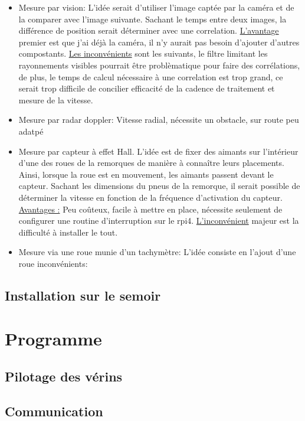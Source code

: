 \begin{itemize}
    \item Mesure par vision: L'idée serait d'utiliser l'image captée par la caméra et de la comparer avec l'image suivante. Sachant le temps entre deux images,
          la différence de position serait déterminer avec une correlation. \underline{L'avantage} premier est que j'ai déjà la caméra, il n'y aurait pas besoin d'ajouter d'autres compostants.
          \underline{Les inconvénients} sont les suivants, le filtre limitant les rayonnements visibles pourrait être problèmatique pour faire des corrélations, de plus, le temps de calcul nécessaire
          à une correlation est trop grand, ce serait trop difficile de concilier efficacité de la cadence de traitement et mesure de la vitesse.
    \item Mesure par radar doppler: Vitesse radial, nécessite un obstacle, sur route peu adatpé
    \item Mesure par capteur à effet Hall. L'idée est de fixer des aimants sur l'intérieur d'une des roues de la remorques de manière à connaître leurs placements.
          Ainsi, lorsque la roue est en mouvement, les aimants passent devant le capteur. Sachant les dimensions du pneus de la remorque, il serait possible de déterminer la vitesse en fonction de la fréquence d'activation du capteur.
          \underline{Avantages :} Peu coûteux, facile à mettre en place, nécessite seulement de configurer une routine d'interruption sur le \Gls{rpi4}. \underline{L'inconvénient} majeur est la difficulté à installer le tout.
    \item Mesure via une roue munie d'un tachymètre: L'idée consiste en l'ajout d'une roue
          inconvénients:
\end{itemize}

\subsection{Installation sur le semoir}

\section{Programme}
\subsection{Pilotage des vérins}
\subsection{Communication}